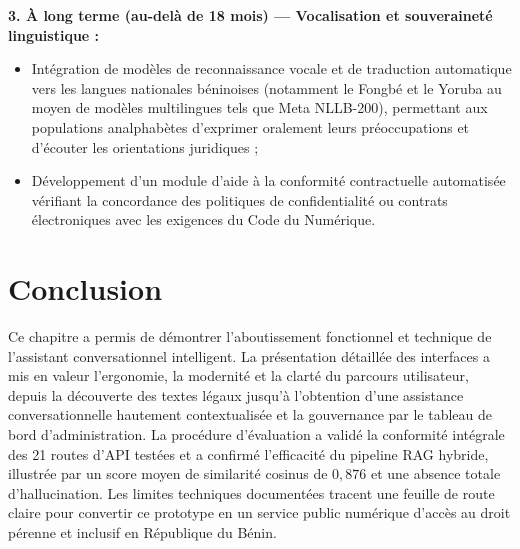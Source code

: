 \medskip

\noindent\textbf{3. À long terme (au-delà de 18 mois) — Vocalisation et souveraineté linguistique :}
\begin{itemize}
    \item Intégration de modèles de reconnaissance vocale et de traduction automatique vers les langues nationales béninoises (notamment le Fongbé et le Yoruba au moyen de modèles multilingues tels que Meta NLLB-200), permettant aux populations analphabètes d'exprimer oralement leurs préoccupations et d'écouter les orientations juridiques ;
    \item Développement d'un module d'aide à la conformité contractuelle automatisée vérifiant la concordance des politiques de confidentialité ou contrats électroniques avec les exigences du Code du Numérique.
\end{itemize}

\clearpage
\section*{Conclusion}

Ce chapitre a permis de démontrer l'aboutissement fonctionnel et technique de l'assistant conversationnel intelligent. La présentation détaillée des interfaces a mis en valeur l'ergonomie, la modernité et la clarté du parcours utilisateur, depuis la découverte des textes légaux jusqu'à l'obtention d'une assistance conversationnelle hautement contextualisée et la gouvernance par le tableau de bord d'administration. La procédure d'évaluation a validé la conformité intégrale des 21 routes d'API testées et a confirmé l'efficacité du pipeline RAG hybride, illustrée par un score moyen de similarité cosinus de $0{,}876$ et une absence totale d'hallucination. Les limites techniques documentées tracent une feuille de route claire pour convertir ce prototype en un service public numérique d'accès au droit pérenne et inclusif en République du Bénin.
